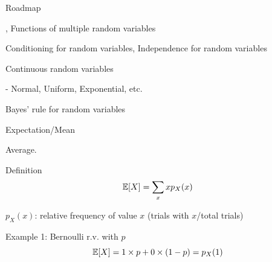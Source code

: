 \documentclass[fleqn,aspectratio=169]{beamer}
\begin{document}
\begin{frame}{Roadmap}

\plitemsep 0.1in

\bci
\item {}

\item {}

\item {}, Functions of multiple random variables 

\item Conditioning for random variables, Independence for random variables 

\item Continuous random variables

- Normal, Uniform, Exponential, etc. 

\item Bayes' rule for random variables
\eci 

\end{frame}




\begin{frame}{Expectation/Mean}

\plitemsep 0.1in
\bci 
\item Average. 
\begin{block}{Definition}
$$
\mathbb{E}[ X ] = \sum_{x} x p_X(x)
$$
\end{block}

\item $p_X(x)$: relative frequency of value $x$ (trials with $x$/total trials)

\item<2-> Example 1: Bernoulli r.v. with $p$
$$
\mathbb{E}[ X ] = 1\times p + 0 \times (1-p) = p_X(1)
$$
\eci 

\end{frame}
\end{document}
